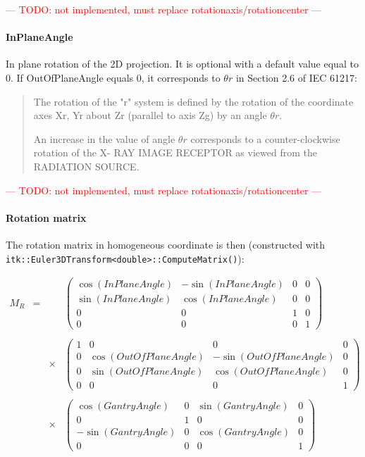 \documentclass{article}
\newcommand{\question}[1]{\textcolor{red}{--- #1 ---}}
\newcommand{\biec}{\begin{quote}\begin{small}}
\newcommand{\eiec}{\end{small}\end{quote}}
\begin{document}
\question{TODO: not implemented, must replace rotationaxis/rotationcenter}

\paragraph{InPlaneAngle} 

In plane rotation of the 2D projection. It is optional with a default value equal to 0. If OutOfPlaneAngle equals 0, it corresponds to $\theta r$ in Section 2.6 of IEC 61217:


\biec
The rotation of the "r" system is defined by the rotation of the coordinate axes Xr, Yr about Zr (parallel to axis Zg) by an angle $\theta r$.

An increase in the value of angle $\theta r$ corresponds to a counter-clockwise rotation of the X- RAY IMAGE RECEPTOR as viewed from the RADIATION SOURCE.
\eiec

\question{TODO: not implemented, must replace rotationaxis/rotationcenter}

\paragraph{Rotation matrix}

The rotation matrix in homogeneous coordinate is then (constructed with\\ \verb+itk::Euler3DTransform<double>::ComputeMatrix()+):

$$
\begin{array}{lcll}
  M_R & = & & %
  \begin{pmatrix}
    \cos(InPlaneAngle) & -\sin(InPlaneAngle) & 0 & 0\\
    \sin(InPlaneAngle) & \cos(InPlaneAngle) & 0 & 0\\
    0 & 0 & 1 & 0\\
    0 & 0 & 0 & 1
  \end{pmatrix} \\
  \\ & & \times & %
  \begin{pmatrix}
    1 & 0 & 0 & 0\\
    0 & \cos(OutOfPlaneAngle) & -\sin(OutOfPlaneAngle) & 0\\
    0 & \sin(OutOfPlaneAngle) & \cos(OutOfPlaneAngle) & 0\\
    0 & 0 & 0 & 1 
  \end{pmatrix} \\
  \\ & & \times & %
  \begin{pmatrix}
    \cos(GantryAngle) & 0 & \sin(GantryAngle) & 0 \\
    0 & 1 & 0 & 0 \\
    -\sin(GantryAngle) & 0 & \cos(GantryAngle) & 0 \\
    0 & 0 & 0 & 1
  \end{pmatrix}
\end{array}
$$
\end{document}
